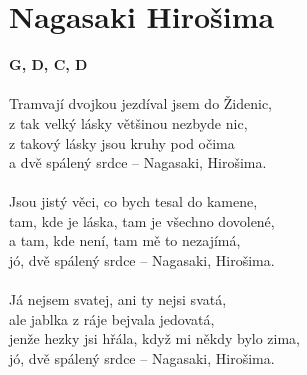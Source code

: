 \section{Nagasaki Hirošima}
\footnotesize\textbf{G, D, C, D}\\
\\
\normalsize
{}Tramvají dvojkou jezdíval jsem do Židenic,\\
z tak velký lásky většinou nezbyde nic,\\
z takový lásky jsou kruhy pod očima\\
a dvě spálený srdce – Nagasaki, Hirošima.\\
\\
Jsou jistý věci, co bych tesal do kamene,\\
tam, kde je láska, tam je všechno dovolené,\\
a tam, kde není, tam mě to nezajímá,\\
jó, dvě spálený srdce – Nagasaki, Hirošima.\\
\\
Já nejsem svatej, ani ty nejsi svatá,\\
ale jablka z ráje bejvala jedovatá,\\
jenže hezky jsi hřála, když mi někdy bylo zima,\\
jó, dvě spálený srdce – Nagasaki, Hirošima.\\
